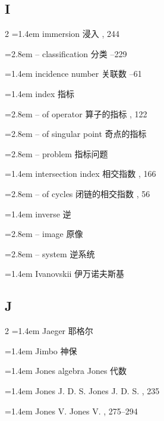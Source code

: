 \subsection*{I}
\small
\begin{multicols}{2}
\noindent\hangindent=1.4em immersion \quad 浸入 , 244\par
\noindent\hangindent=2.8em -- classification \quad 分类 --229\par
\noindent\hangindent=1.4em incidence number \quad 关联数 --61\par
\noindent\hangindent=1.4em index \quad 指标 \quad\par
\noindent\hangindent=2.8em -- of operator \quad 算子的指标 , 122\par
\noindent\hangindent=2.8em -- of singular point \quad 奇点的指标 \par
\noindent\hangindent=2.8em -- problem \quad 指标问题 \par
\noindent\hangindent=1.4em intersection index \quad 相交指数 , 166\par
\noindent\hangindent=2.8em -- of cycles \quad 闭链的相交指数 , 56\par
\noindent\hangindent=1.4em inverse \quad 逆 \quad\par
\noindent\hangindent=2.8em -- image \quad 原像 \par
\noindent\hangindent=2.8em -- system \quad 逆系统 \par
\noindent\hangindent=1.4em Ivanovskii \quad 伊万诺夫斯基 \par
\end{multicols}

\subsection*{J}
\small
\begin{multicols}{2}
\noindent\hangindent=1.4em Jaeger \quad 耶格尔 \par
\noindent\hangindent=1.4em Jimbo \quad 神保 \par
\noindent\hangindent=1.4em Jones algebra \quad Jones 代数 \par
\noindent\hangindent=1.4em Jones J. D. S. \quad Jones J. D. S. , 235\par
\noindent\hangindent=1.4em Jones V. \quad Jones V. , 275--294\par
\end{multicols}

